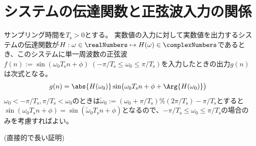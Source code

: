 		\section{システムの伝達関数と正弦波入力の関係}
			\newcommand{\Ts}{T_\text{s}}
			\begin{shadebox}
				サンプリング時間を$\Ts>0$とする。
				実数値の入力に対して実数値を出力するシステムの伝達関数が$H:\omega\in\realNumbers\mapsto H(\omega)\in\complexNumbers$であるとき、このシステムに単一周波数の正弦波$f(n) := \sin(\omega_0 \Ts n + \phi)\;(-\pi/\Ts\leq\omega_0\leq\pi/\Ts)$を入力したときの出力$g(n)$は次式となる。
				\[ g(n) = \abs{H(\omega_0)}\sin\bigl(\omega_0 \Ts n + \phi + \Arg{H(\omega_0)}\bigr) \]
				$\omega_0<-\pi/\Ts, \pi/\Ts<\omega_0$のときは$\tilde{\omega}_0 := (\omega_0+\pi/\Ts)\%(2\pi/\Ts)-\pi/\Ts$とすると$\sin(\omega_0 \Ts n + \phi) = \sin(\tilde{\omega}_0 \Ts n + \phi)$となるので、$-\pi/\Ts\leq\omega_0\leq\pi/\Ts$の場合のみを考慮すればよい。
			\end{shadebox}
			(直接的で長い証明)
